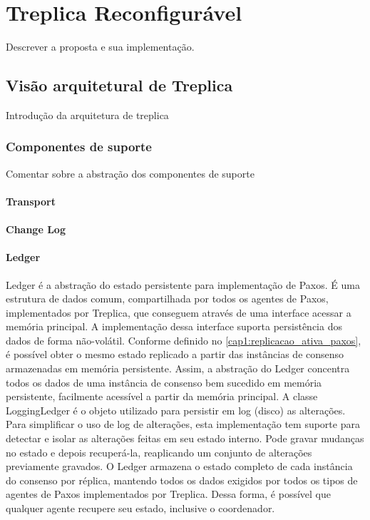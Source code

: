 \chapter{Treplica Reconfigurável}\label{cap2}

Descrever a proposta e sua implementação.

\section{Visão arquitetural de Treplica}

Introdução da arquitetura de treplica

\subsection{Componentes de suporte}

Comentar sobre a abstração dos componentes de suporte

\subsubsection{Transport}\label{subsec:transport}

\subsubsection{Change Log}

\subsubsection{Ledger}

Ledger é a abstração do estado persistente para implementação de Paxos. É uma estrutura
de dados comum, compartilhada por todos os agentes de Paxos, implementados por Treplica,
que conseguem através de uma interface acessar a memória principal. A implementação dessa
interface suporta persistência dos dados de forma não-volátil. Conforme definido no
\autoref{cap1:replicacao_ativa_paxos}, é possível obter o mesmo estado replicado a partir
das instâncias de consenso armazenadas em memória persistente. Assim, a abstração do
Ledger concentra todos os dados de uma instância de consenso bem sucedido em memória
persistente, facilmente acessível a partir da memória principal. A classe LoggingLedger é
o objeto utilizado para persistir em log (disco) as alterações. Para simplificar o uso de
log de alterações, esta implementação tem suporte para detectar e isolar as alterações
feitas em seu estado interno. Pode gravar mudanças no estado e depois recuperá-la,
reaplicando um conjunto de alterações previamente gravados. O Ledger armazena o estado
completo de cada instância do consenso por réplica, mantendo todos os dados exigidos por
todos os tipos de agentes de Paxos implementados por Treplica. Dessa forma, é possível que
qualquer agente recupere seu estado, inclusive o coordenador.

